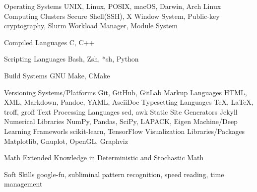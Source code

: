 

\begin{cvskills}

  \cvskill
    {Operating Systems} %
    {UNIX, Linux, POSIX, macOS, Darwin, Arch Linux} %
  \cvskill
    {Computing Clusters} %
    {Secure Shell(SSH), X Window System, Public-key cryptography, Slurm Workload Manager, Module System} %

  \cvskill
    {Compiled Languages} %
    {C, C++} %

  \cvskill
    {Scripting Languages} %
    {Bash, Zsh, *sh, Python} %

  \cvskill
    {Build Systems} %
    {GNU Make, CMake} %

  \cvskill
    {Versioning Systems/Platforms} %
    {Git, GitHub, GitLab} %
  \cvskill
    {Markup Languages} %
    {HTML, XML, Markdown, Pandoc, YAML, AsciiDoc}
  \cvskill
    {Typesetting Languages} %
    {TeX, LaTeX, troff, groff}
  \cvskill
    {Text Processing Languages} %
    {sed, awk}
  \cvskill
    {Static Site Generators} %
    {Jekyll} %
  \cvskill
    {Numerical Libraries} %
    {NumPy, Pandas, SciPy, LAPACK, Eigen} %
  \cvskill
    {Machine/Deep Learning Frameworls} %
    {scikit-learn, TensorFlow} %
  \cvskill
    {Visualization Libraries/Packages} %
    {Matplotlib, Gnuplot, OpenGL, Graphviz} %

  \cvskill
    {Math} %
    {Extended Knowledge in Deterministic and Stochastic Math} %

    
  \cvskill
    {Soft Skills} %
    {google-fu, subliminal pattern recognition, speed reading, time management} %
\end{cvskills}

